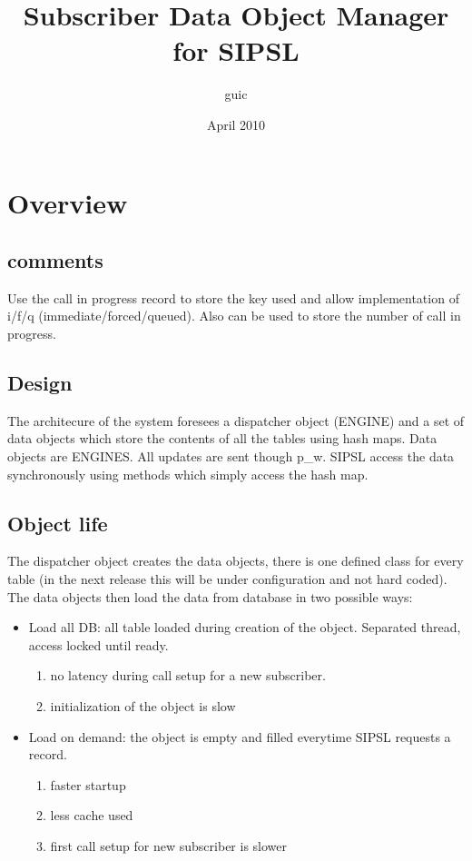 \documentclass[a4paper]{article}
\title{Subscriber Data Object Manager for SIPSL}
\author{guic}
\date{April 2010}
\begin{document}
	\small
	\maketitle
\section{Overview}

\subsection{comments}
Use the call in progress record to store the key used and allow implementation
of i/f/q (immediate/forced/queued).
Also can be used to store the number of call in progress.

\subsection{Design}
The architecure of the system foresees a dispatcher object (ENGINE) and a set of data objects which store the contents of all the tables using hash maps.
Data objects are ENGINES.
All updates are sent though p\_w. SIPSL access the data synchronously using methods which simply access the hash map. 

\subsection{Object life}

The dispatcher object creates the data objects, there is one defined class for
every table (in the next release this will be under configuration and not hard coded).
The data objects then load the data from database in two possible ways:

\begin{itemize}
   \item Load all DB: all table loaded during creation of the object. Separated
   thread, access locked until ready.
    \begin{enumerate}
            \item no latency during call setup for a new subscriber.
            \item initialization of the object is slow
    \end{enumerate}
   \item Load on demand: the object is empty and filled everytime SIPSL
   requests a record.
       \begin{enumerate}
            \item faster startup
            \item less cache used
            \item first call setup for new subscriber is slower
    \end{enumerate}
\end{itemize}
\end{document}
